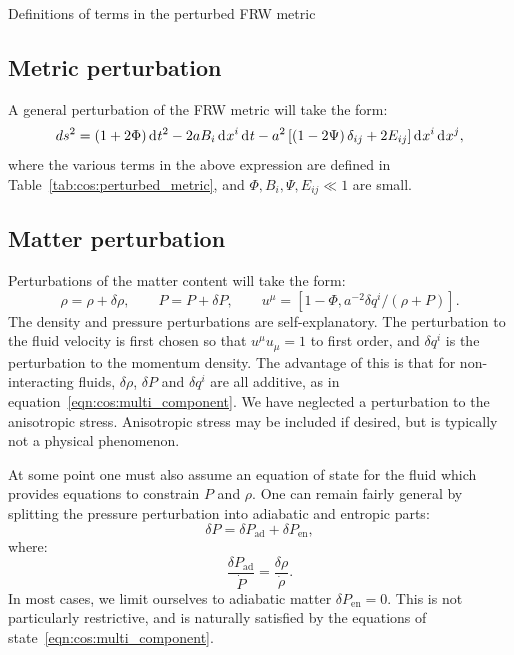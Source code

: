 \begin{table}[tp]
  \centering
  
  \caption{Definitions of terms in the perturbed FRW metric}\label{tab:cos:perturbed_metric}
\end{table}


\subsection{Metric perturbation}
A general perturbation of the FRW metric will take the form:
\begin{equation}
  ds^2 = (1+2\Phi)\operatorname{d}^{}\!{t}^2 -2a B_i \operatorname{d}^{}\!{x}^i \operatorname{d}^{}\!{t}  -a^2 \left[ \left( 1 - 2 \Psi \right)\delta_{ij} + 2E_{ij} \right] \operatorname{d}^{}\!{x}^i \operatorname{d}^{}\!{x}^j,
  \label{eqn:cos:FRW_perturb}
\end{equation}
where the various terms in the above expression are defined in Table~\ref{tab:cos:perturbed_metric}, and ${\Phi,B_i,\Psi,E_{ij}\ll1}$ are small. 

\subsection{Matter perturbation}
Perturbations of the matter content will take the form:
\begin{equation}
  \rho = \rho + \delta \rho, \qquad 
  P = P + \delta P, \qquad
  u^\mu = \left[ 1-\Phi, a^{-2} \delta q^i/(\rho+P)\right].
  \label{eqn:cos:matter_perturb}
\end{equation}
The density and pressure perturbations are self-explanatory. The perturbation to the fluid velocity is first chosen so that $u^\mu u_\mu=1$ to first order, and $\delta q^i$ is the perturbation to the momentum density. The advantage of this is that for non-interacting fluids, $\delta\rho$, $\delta P$ and $\delta q^i$ are all additive, as in equation~\eqref{eqn:cos:multi_component}. We have neglected a perturbation to the anisotropic stress. Anisotropic stress may be included if desired, but is typically not a physical phenomenon. 

At some point one must also assume an equation of state for the fluid which provides equations to constrain $P$ and $\rho$. One can remain fairly general by splitting the pressure perturbation into adiabatic and entropic parts:
\begin{equation}
  \delta P = \delta P_\mathrm{ad} + \delta P_\mathrm{en},
  \label{eqn:cos:adiabatic_entropic}
\end{equation} 
where:
\begin{equation}
  \frac{\delta P_\mathrm{ad}}{\dot{P}} = \frac{\delta\rho}{\dot{\rho}}.
  \label{eqn:cos:adiabatic}
\end{equation} 
In most cases, we limit ourselves to adiabatic matter $\delta P_\mathrm{en}=0$.
This is not particularly restrictive, and is naturally satisfied by the equations of state~\eqref{eqn:cos:multi_component}.

